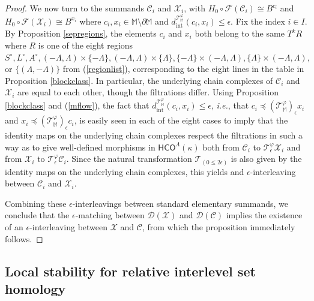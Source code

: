 \documentclass[11pt]{amsart}
\theoremstyle{definition}
\theoremstyle{remark}
\numberwithin{equation}{section}
\def\ep{\epsilon}
\begin{document}
\begin{proof}
We now turn to the summands $\mathcal{C}_i$ and $\mathcal{X}_i$, with $H_0\circ\mathcal{F}(\mathcal{C}_i)\cong B^{c_i}$ and $H_0\circ\mathcal{F}(\mathcal{X}_i)\cong B^{x_i}$ where $c_i,x_i\in\mathbb{M}\setminus\partial\mathbb{M}$ and $d_{\mathrm{int}}^{\mathcal{T}_{\mathbb{M}}^{\varphi}}(c_i,x_i)\leq \ep$.  Fix the index $i\in I$.  By Proposition \ref{sepregions}, the elements $c_i$ and $x_i$ both belong to the same $T^kR$ where $R$ is one of the eight regions  
 $S^{\circ},L^{\circ}, A^{\circ},(-\Lambda,\Lambda)\times\{-\Lambda\},(-\Lambda,\Lambda)\times\{\Lambda\},\{-\Lambda\}\times (-\Lambda,\Lambda),\{\Lambda\}\times (-\Lambda,\Lambda),$ or $\{(\Lambda,-\Lambda)\}$ from (\ref{regionlist}), corresponding to the eight lines in the table in Proposition \ref{blockclass}.  In particular, the underlying chain complexes of $\mathcal{C}_i$ and $\mathcal{X}_i$ are equal to each other, though the filtrations differ.  Using Proposition \ref{blockclass} and (\ref{mflow}), the fact that $d_{\mathrm{int}}^{\mathcal{T}_{\mathbb{M}}^{\varphi}}(c_i,x_i)\leq \ep$, \emph{i.e.}, that $c_i\preceq (\mathcal{T}^{\varphi}_{\mathbb{M}})_{\ep}x_i$ and $x_i\preceq (\mathcal{T}^{\varphi}_{\mathbb{M}})_{\ep}c_i$, is easily seen in each of the eight cases to imply that the identity maps on the underlying chain complexes respect the filtrations in such a way as to give well-defined morphisms in $\mathsf{HCO}^{\Lambda}(\kappa)$ both from $\mathcal{C}_i$ to $\mathcal{T}^{\varphi}_{\ep}\mathcal{X}_i$ and from $\mathcal{X}_i$ to $\mathcal{T}^{\varphi}_{\ep}\mathcal{C}_i$.  Since the natural transformation $\mathcal{T}_{(0\leq 2\ep)}$ is also given by the identity maps on the underlying chain complexes, this yields and $\ep$-interleaving between $\mathcal{C}_i$ and $\mathcal{X}_i$.
 
Combining these $\ep$-interleavings between standard elementary summands, we conclude that the $\ep$-matching between $\mathcal{D}(\mathcal{X})$ and $\mathcal{D}(\mathcal{C})$ implies the existence of an $\ep$-interleaving between $\mathcal{X}$ and $\mathcal{C}$, from which the proposition immediately follows.  
\end{proof}

\subsection{Local stability for relative interlevel set homology}
\end{document}
